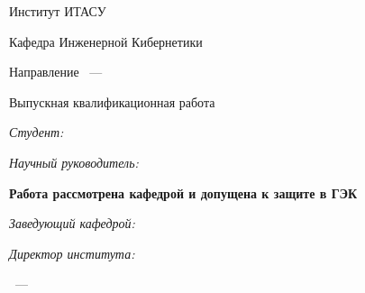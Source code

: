 \thispagestyle{empty}%

\begin{center}%
    \MakeUppercase{\thesisOrganization}
\end{center}%
%

\vspace{0pt plus1fill} %
\begin{center}%
    
    Институт ИТАСУ
    
    Кафедра Инженерной Кибернетики
    
    Направление \thesisSpecialtyNumber~---~\thesisSpecialtyTitle

\end{center}

\vspace{0pt plus4fill} 

\begin{center}%
    {\large Выпускная квалификационная работа \thesisDegree}
    
    \vspace{0pt plus2fill}
    
    \textbf {\large \thesisTitle}
    
\end{center}

\vspace{0pt plus4fill}

\begin{flushleft}%
    \linespread{2}\selectfont\emph{Студент:}   
    \thesisAuthor
    
    \linespread{2}\selectfont\emph{Научный руководитель:} 
    \supervisorRegalia~  
    \supervisorFio
    
    \vspace{0pt plus3fill}
    
    \linespread{2}\selectfont\textbf{Работа рассмотрена кафедрой и допущена к защите в ГЭК}
    
    \linespread{2}\selectfont\emph{Заведующий кафедрой:}\hrulefill
    
    \linespread{2}\selectfont\emph{Директор института:}\hrulefill

\end{flushleft}%
%

\vspace{0pt plus1fill}


\begin{center}%
    {\thesisCity~--- \thesisYear}
\end{center}%
\newpage

\addtocounter{page}{2}